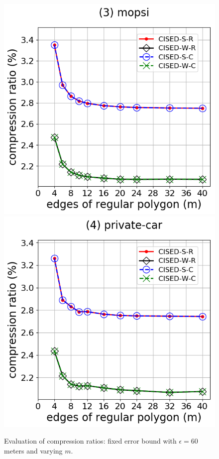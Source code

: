 \begin{figure}[tb!]
\includegraphics[scale = 0.275]{Figures/Exp-M-e-60-CR-mopsi.png}\hspace{3ex}
\includegraphics[scale = 0.275]{Figures/Exp-M-e-60-CR-private.png}
\caption{\small Evaluation of compression ratios: fixed error bound with $\epsilon=60$ meters and varying $m$.}
\label{fig:m-cr-e60}
\vspace{-1ex}
\end{figure}


